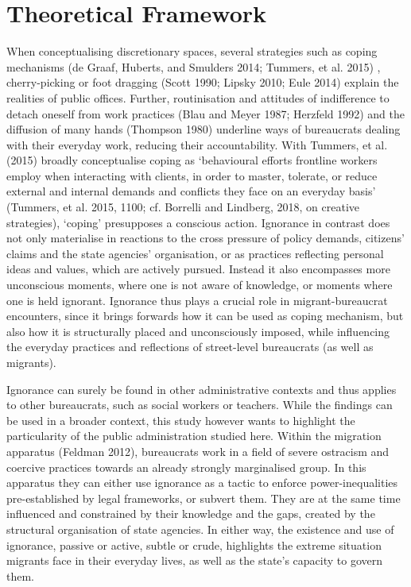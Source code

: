 \chapter{Theoretical Framework}
When conceptualising discretionary spaces, several strategies such as coping mechanisms (de Graaf, Huberts, and Smulders 2014; Tummers, et al. 2015) , cherry-picking or foot dragging (Scott 1990; Lipsky 2010; Eule 2014) explain the realities of public offices. Further, routinisation and attitudes of indifference to detach oneself from work practices (Blau and Meyer 1987; Herzfeld 1992) and the diffusion of many hands (Thompson 1980) underline ways of bureaucrats dealing with their everyday work, reducing their accountability. With Tummers, et al. (2015) broadly conceptualise coping as ‘behavioural efforts frontline workers employ when interacting with clients, in order to master, tolerate, or reduce external and internal demands and conflicts they face on an everyday basis’ (Tummers, et al. 2015, 1100; cf. Borrelli and Lindberg, 2018, on creative strategies), ‘coping’ presupposes a conscious action. Ignorance in contrast does not only materialise in reactions to the cross pressure of policy demands, citizens’ claims and the state agencies’ organisation, or as practices reflecting personal ideas and values, which are actively pursued. Instead it  also encompasses more unconscious moments, where one is not aware of knowledge, or moments where one is held ignorant. Ignorance thus plays a crucial role in migrant-bureaucrat encounters, since it brings forwards how it can be used as coping mechanism, but also how it is structurally placed and unconsciously imposed, while influencing the everyday practices and reflections of street-level bureaucrats (as well as migrants).
\par
Ignorance can surely be found in other administrative contexts and thus applies to other bureaucrats, such as social workers or teachers. While the findings can be used in a broader context, this study however wants to highlight the particularity of the public administration studied here. Within the migration apparatus (Feldman 2012), bureaucrats work in a field of severe ostracism and coercive practices towards an already strongly marginalised group. In this apparatus they can either use ignorance as a tactic to enforce power-inequalities pre-established by legal frameworks, or subvert them. They are at the same time influenced and constrained by their knowledge and the gaps, created by the structural organisation of state agencies. In either way, the existence and use of ignorance, passive or active, subtle or crude, highlights the extreme situation migrants face in their everyday lives, as well as the state’s capacity to govern them.

